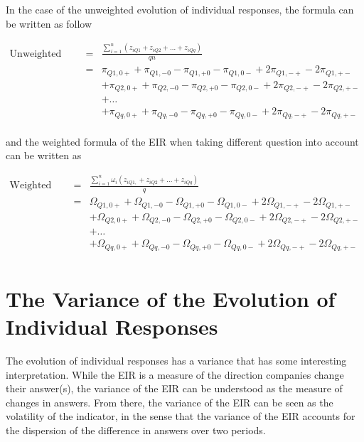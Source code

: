 \documentclass[12pt,a4paper,oneside]{book}
\begin{document}
In the case of the unweighted evolution of individual responses, the formula can be written as follow

\begin{eqnarray}
\mbox{Unweighted EIR}\ &=& \frac{\sum_{i=1}^n \left(z_{i Q1} + z_{i Q2} + \ldots + z_{i Qq} \right)}{qn} \nonumber \\
&=&    \pi_{Q1,0+} + \pi_{Q1,-0} - \pi_{Q1,+0} - \pi_{Q1,0-} +2 \pi_{Q1,-+} -2\pi_{Q1,+-} \nonumber \\
&&    + \pi_{Q2,0+} + \pi_{Q2,-0} - \pi_{Q2,+0} - \pi_{Q2,0-} +2 \pi_{Q2,-+} -2\pi_{Q2,+-} \nonumber \\
&&	 + \ldots \nonumber \\
&&   + \pi_{Qq,0+} + \pi_{Qq,-0} - \pi_{Qq,+0} - \pi_{Qq,0-} +2 \pi_{Qq,-+} -2\pi_{Qq,+-} \nonumber \\
\end{eqnarray}

and the weighted formula of the EIR when taking different question into account can be written as

\begin{eqnarray}
    \mbox{Weighted EIR}\ &=& \frac{ \sum_{i=1}^n \omega_i \left(z_{i Q1,} + z_{i Q2} + \ldots + z_{i Qq} \right)}{q} \nonumber \\
&=&    \Omega_{Q1,0+} + \Omega_{Q1,-0} - \Omega_{Q1,+0} - \Omega_{Q1,0-} +2 \Omega_{Q1,-+} -2\Omega_{Q1,+-} \nonumber \\
&&    + \Omega_{Q2,0+} + \Omega_{Q2,-0} - \Omega_{Q2,+0} - \Omega_{Q2,0-} +2 \Omega_{Q2,-+} -2\Omega_{Q2,+-} \nonumber \\
&&	 + \ldots \nonumber \\
&&   + \Omega_{Qq,0+} + \Omega_{Qq,-0} - \Omega_{Qq,+0} - \Omega_{Qq,0-} +2 \Omega_{Qq,-+} -2\Omega_{Qq,+-} \nonumber \\
\end{eqnarray}




\chapter{The Variance of the Evolution of Individual Responses} \label{Chapter:Var Z}

The evolution of individual responses has a variance that has some interesting interpretation.
While the EIR is a measure of the direction companies change their answer(s), the variance of the EIR can be understood as the measure of changes in answers.
From there, the variance of the EIR can be seen as the volatility of the indicator, in the sense that the variance of the EIR accounts for the dispersion of the difference in answers over two periods.
\end{document}
